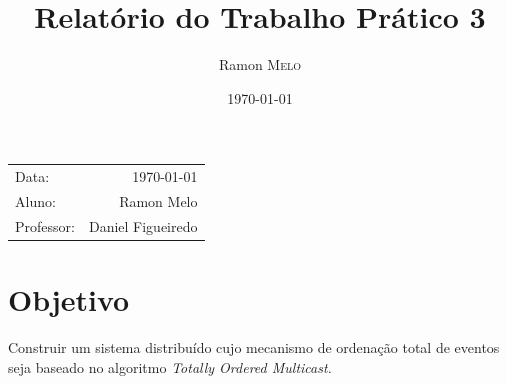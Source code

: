 \documentclass[a4paper,12pt]{article}
\title{Relatório do Trabalho Prático 3} %
\author{Ramon \textsc{Melo}} %
\date{\today} %
\begin{document}

        \begin{center}
            \begin{tabular}{l r}
                Data: & \today \\ %
                Aluno: & Ramon Melo \\ %
                Professor: & Daniel Figueiredo %
            \end{tabular}
        \end{center}


        
        \section{Objetivo}
        
            Construir um sistema distribuído cujo mecanismo de ordenação total de eventos seja baseado no algoritmo \em{Totally Ordered Multicast}.
            
            
\end{document}
